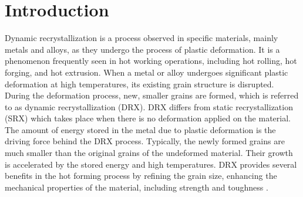 \documentclass[metals,article,submit,pdftex,moreauthors]{Definitions/mdpi}
\begin{document}
\section{Introduction\label{sec:Introduction}}

Dynamic recrystallization is a process observed in specific materials, mainly metals and alloys, as they undergo the process of plastic deformation.
It is a phenomenon frequently seen in hot working operations, including hot rolling, hot forging, and hot extrusion.
When a metal or alloy undergoes significant plastic deformation at high temperatures, its existing grain structure is disrupted.
During the deformation process, new, smaller grains are formed, which is referred to as dynamic recrystallization (DRX).
DRX differs from static recrystallization (SRX) which takes place when there is no deformation applied on the material.
The amount of energy stored in the metal due to plastic deformation is the driving force behind the DRX process.
Typically, the newly formed grains are much smaller than the original grains of the undeformed material.
Their growth is accelerated by the stored energy and high temperatures.
DRX provides several benefits in the hot forming process by refining the grain size, enhancing the mechanical properties of the material, including strength and toughness \cite{javidikia2023grain, dourandish2022microstructure, shen2021effect}.
\end{document}
